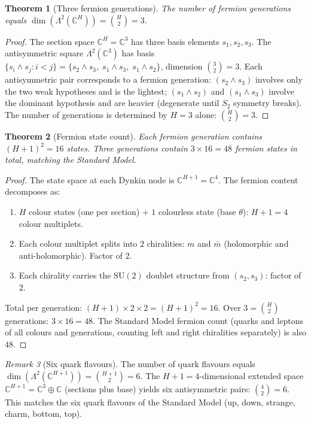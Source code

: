 \documentclass[11pt,a4paper]{article}
\newtheorem{theorem}{Theorem}[section]
\theoremstyle{definition}
\theoremstyle{remark}
\newtheorem{remark}[theorem]{Remark}
\newcommand{\C}{\mathbb{C}}
\newcommand{\SU}{\mathrm{SU}}
\begin{document}
\begin{theorem}[Three fermion generations]\label{thm:three_generations}
The number of fermion generations equals $\dim(\Lambda^2(\C^H))=\binom{H}{2}=3$.
\end{theorem}

\begin{proof}
The section space $\C^H=\C^3$ has three basis elements $s_1,s_2,s_3$. The antisymmetric square $\Lambda^2(\C^3)$ has basis $\{s_i\wedge s_j: i<j\}=\{s_2\wedge s_3,\;s_1\wedge s_3,\;s_1\wedge s_2\}$, dimension $\binom{3}{2}=3$. Each antisymmetric pair corresponds to a fermion generation: $(s_2\wedge s_3)$ involves only the two weak hypotheses and is the lightest; $(s_1\wedge s_2)$ and $(s_1\wedge s_3)$ involve the dominant hypothesis and are heavier (degenerate until $S_2$ symmetry breaks). The number of generations is determined by $H=3$ alone: $\binom{H}{2}=3$.
\end{proof}

\begin{theorem}[Fermion state count]\label{thm:fermion_count}
Each fermion generation contains $(H+1)^2=16$ states. Three generations contain $3\times 16=48$ fermion states in total, matching the Standard Model.
\end{theorem}

\begin{proof}
The state space at each Dynkin node is $\C^{H+1}=\C^4$. The fermion content decomposes as:
\begin{enumerate}[nosep]
\item $H$ colour states (one per section) $+$ $1$ colourless state (base $\theta$): $H+1=4$ colour multiplets.
\item Each colour multiplet splits into $2$ chiralities: $m$ and $\bar m$ (holomorphic and anti-holomorphic). Factor of $2$.
\item Each chirality carries the $\SU(2)$ doublet structure from $(s_2,s_3)$: factor of $2$.
\end{enumerate}
Total per generation: $(H+1)\times 2\times 2=(H+1)^2=16$. Over $3=\binom{H}{2}$ generations: $3\times 16=48$. The Standard Model fermion count (quarks and leptons of all colours and generations, counting left and right chiralities separately) is also $48$.
\end{proof}

\begin{remark}[Six quark flavours]\label{rem:six_flavours}
The number of quark flavours equals $\dim(\Lambda^2(\C^{H+1}))=\binom{H+1}{2}=6$. The $H+1=4$-dimensional extended space $\C^{H+1}=\C^3\oplus\C$ (sections plus base) yields six antisymmetric pairs: $\binom{4}{2}=6$. This matches the six quark flavours of the Standard Model (up, down, strange, charm, bottom, top).
\end{remark}
\end{document}
